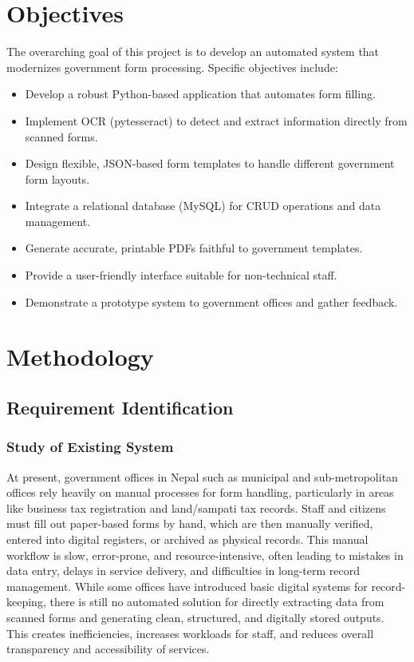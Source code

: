 \documentclass[12pt,a4paper]{report}
\begin{document}
\chapter{Objectives}
The overarching goal of this project is to develop an automated system that modernizes government form processing. Specific objectives include:
\begin{itemize}
    \item Develop a robust Python-based application that automates form filling.
    \item Implement OCR (pytesseract) to detect and extract information directly from scanned forms.
    \item Design flexible, JSON-based form templates to handle different government form layouts.
    \item Integrate a relational database (MySQL) for CRUD operations and data management.
    \item Generate accurate, printable PDFs faithful to government templates.
    \item Provide a user-friendly interface suitable for non-technical staff.
    \item Demonstrate a prototype system to government offices and gather feedback.
\end{itemize}

\chapter{Methodology}
\section{Requirement Identification}
\subsection{Study of Existing System}
At present, government offices in Nepal such as municipal and sub-metropolitan offices rely heavily on manual processes for form handling, particularly in areas like business tax registration and land/sampati tax records. Staff and citizens must fill out paper-based forms by hand, which are then manually verified, entered into digital registers, or archived as physical records. This manual workflow is slow, error-prone, and resource-intensive, often leading to mistakes in data entry, delays in service delivery, and difficulties in long-term record management. While some offices have introduced basic digital systems for record-keeping, there is still no automated solution for directly extracting data from scanned forms and generating clean, structured, and digitally stored outputs. This creates inefficiencies, increases workloads for staff, and reduces overall transparency and accessibility of services.
\end{document}
